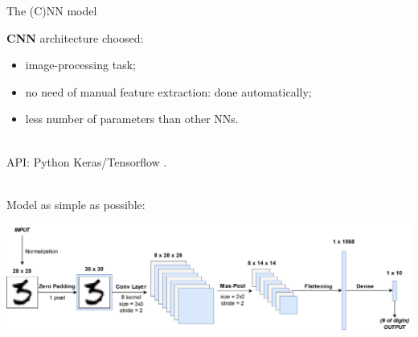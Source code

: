 \documentclass[10pt, xcolor=dvipsnames, compress]{beamer}
\begin{document}
\begin{frame}{The (C)NN model}

    \textbf{CNN} architecture choosed:
    \begin{itemize}
        \item image-processing task;
        \item no need of manual feature extraction: done automatically;
        \item less number of parameters than other NNs.\\~\
    \end{itemize}


    API: Python Keras/Tensorflow \cite*{keras}.\\~\

    Model as simple as possible:
    \begin{center}
        \includegraphics[width=\textwidth]{nndrawio2.png}
    \end{center}

\end{frame}


\end{document}
